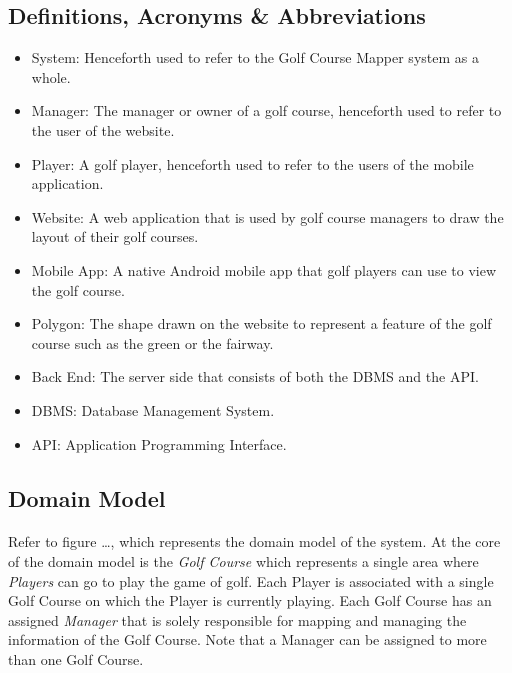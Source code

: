 \documentclass{article}
\begin{document}
    \subsection{Definitions, Acronyms \& Abbreviations}
    \begin{itemize}
        \item
            System: Henceforth used to refer to the Golf Course Mapper system
            as a whole.
        \item
            Manager: The manager or owner of a golf course, henceforth used to
            refer to the user of the website.
        \item
            Player: A golf player, henceforth used to refer to the users of the
            mobile application.
        \item
            Website: A web application that is used by golf course managers
            to draw the layout of their golf courses.
        \item
            Mobile App: A native Android mobile app that golf players can use to
            view the golf course.
        \item
            Polygon: The shape drawn on the website to represent a feature of
            the golf course such as the green or the fairway.
        \item
            Back End: The server side that consists of both the DBMS and the
            API.
        \item
            DBMS: Database Management System.
        \item
            API: Application Programming Interface.
    \end{itemize}

    \subsection{Domain Model}

    \paragraph{}
    Refer to figure \ldots, which represents the domain model of the system. At
    the core of the domain model is the \textit{Golf Course} which represents a
    single area where \textit{Players} can go to play the game of golf. Each
    Player is associated with a single Golf Course on which the Player is
    currently playing. Each Golf Course has an assigned \textit{Manager} that is
    solely responsible for mapping and managing the information of the Golf
    Course. Note that a Manager can be assigned to more than one Golf Course.
\end{document}
